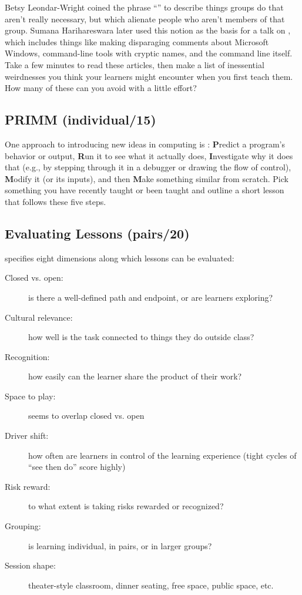 Betsy Leondar-Wright coined the phrase ``'' to describe things groups do that
aren't really necessary, but which alienate people who aren't members
of that group. Sumana Harihareswara later used this notion as the
basis for a talk on , which includes things
like making disparaging comments about Microsoft Windows, command-line
tools with cryptic names, and the command line itself. Take a few
minutes to read these articles, then make a list of inessential
weirdnesses you think your learners might encounter when you first
teach them. How many of these can you avoid with a little effort?

\subsection*{PRIMM (individual/15)}

One approach to introducing new ideas in computing is :
\textbf{P}redict a program's behavior or output, \textbf{R}un it to see what it
actually does, \textbf{I}nvestigate why it does that (e.g., by stepping
through it in a debugger or drawing the flow of control), \textbf{M}odify
it (or its inputs), and then \textbf{M}ake something similar from scratch.
Pick something you have recently taught or been taught and outline a
short lesson that follows these five steps.

\subsection*{Evaluating Lessons (pairs/20)}

\cite{Mart2017} specifies eight dimensions along which lessons can be
evaluated:

\begin{description}
\item[Closed vs. open:]
is there a well-defined path and endpoint, or are learners
exploring?
\item[Cultural relevance:]
how well is the task connected to things they do outside class?
\item[Recognition:]
how easily can the learner share the product of their work?
\item[Space to play:]
seems to overlap closed vs. open
\item[Driver shift:]
how often are learners in control of the learning experience (tight
cycles of ``see then do'' score highly)
\item[Risk reward:]
to what extent is taking risks rewarded or recognized?
\item[Grouping:]
is learning individual, in pairs, or in larger groups?
\item[Session shape:]
theater-style classroom, dinner seating, free space, public space,
etc.
\end{description}

